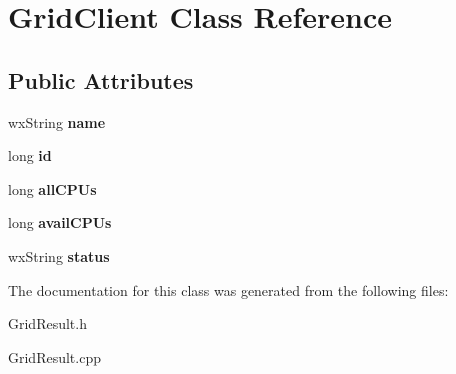 \hypertarget{class_grid_client}{}\section{Grid\+Client Class Reference}
\label{class_grid_client}
\subsection*{Public Attributes}
\begin{DoxyCompactItemize}
\item 
\mbox{\label{class_grid_client_a83f8cd605abbf92b4cc44ab8dfc9bf5e}} 
wx\+String {\bfseries name}
\item 
\mbox{\label{class_grid_client_abbc7d06decb7f1c6d5ee527dd9c4dbe0}} 
long {\bfseries id}
\item 
\mbox{\label{class_grid_client_a2e62f62cd0303b1e9a557c3129cc9923}} 
long {\bfseries all\+C\+P\+Us}
\item 
\mbox{\label{class_grid_client_a6d0a6783024f48dc22bf81b3a5a157f2}} 
long {\bfseries avail\+C\+P\+Us}
\item 
\mbox{\label{class_grid_client_af21f9a2cf675d51f8288354488717425}} 
wx\+String {\bfseries status}
\end{DoxyCompactItemize}


The documentation for this class was generated from the following files\+:\begin{DoxyCompactItemize}
\item 
Grid\+Result.\+h\item 
Grid\+Result.\+cpp\end{DoxyCompactItemize}
